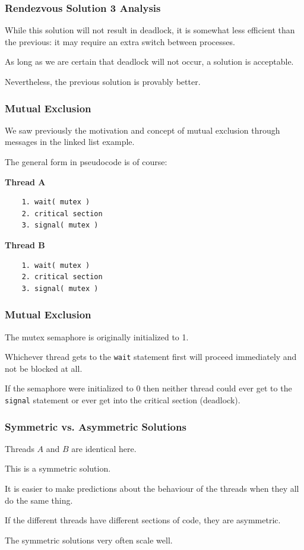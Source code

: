 \begin{frame}
\frametitle{Rendezvous Solution 3 Analysis}

While this solution will not result in deadlock, it is somewhat less efficient than the previous: it may require an extra switch between processes.

As long as we are certain that deadlock will not occur, a solution is acceptable. 

Nevertheless, the previous solution is provably better.



\end{frame}

\begin{frame}[fragile]
\frametitle{Mutual Exclusion}

We saw previously the motivation and concept of mutual exclusion through messages in the linked list example. 

The general form in pseudocode is of course:

\begin{multicols}{2}
\textbf{Thread A}
  \begin{verbatim}
	1. wait( mutex )
	2. critical section
	3. signal( mutex )
  \end{verbatim}
\columnbreak
\textbf{Thread B}
  \begin{verbatim}
	1. wait( mutex )
	2. critical section
	3. signal( mutex )
  \end{verbatim}
\end{multicols}
\vspace{-2em}


\end{frame}

\begin{frame}
\frametitle{Mutual Exclusion}

The mutex semaphore is originally initialized to 1.

Whichever thread gets to the \texttt{wait} statement first will proceed immediately and not be blocked at all. 

If the semaphore were initialized to 0 then neither thread could ever get to the \texttt{signal} statement or ever get into the critical section (deadlock).


\end{frame}

\begin{frame}
\frametitle{Symmetric vs. Asymmetric Solutions}

Threads $A$ and $B$ are identical here.

This is a \alert{symmetric} solution.

It is easier to make predictions about the behaviour of the threads when they all do the same thing. 

If the different threads have different sections of code, they are \alert{asymmetric}. 

The symmetric solutions very often scale well.


\end{frame}

